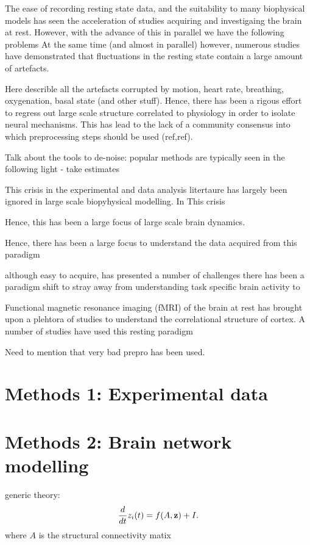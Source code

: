 \documentclass[oneside]{zHenriquesLab-StyleBioRxiv}
\begin{document}
The ease of recording resting state data, and the suitability to many biophysical models has seen the acceleration of studies acquiring and investigaing the brain at rest.
However, with the advance of this in parallel we have the following problems
At the same time (and almost in parallel) however, numerous studies have demonstrated that fluctuations in the resting state contain a large amount of artefacts.

Here describle all the artefacts corrupted by motion, heart rate, breathing, oxygenation, basal state (and other stuff). Hence, there has been a rigous effort to regress out large scale structure correlated to physiology in order to isolate neural mechanisms. This has lead to the lack of a community consensus into which preprocessing steps should be used (ref,ref).

Talk about the tools to de-noise: popular methods are typically seen in the following light - take estimates 


This crisis in the experimental and data analysis litertaure has largely been ignored in large scale biopyhysical modelling. In This crisis


Hence, this has been a large focus of large scale brain dynamics. 

Hence, there has been a large focus to understand the data acquired from this paradigm 

 although easy to acquire, has presented a number of challenges there has been a paradigm shift to stray away from understanding task specific brain activity to 


Functional magnetic resonance imaging (fMRI) of the brain at rest has brought upon a plehtora of studies to understand the correlational structure of cortex. A number of studies have used this resting paradigm 


Need to mention that very bad prepro has been used. 

\section*{Methods 1: Experimental data}

\section*{Methods 2: Brain network modelling}
generic theory:
\begin{equation}
	\frac{d}{dt}z_{i}(t) = f(A,{\bf z}) + I.
\end{equation}
where $A$ is the structural connectivity matix 
\end{document}
